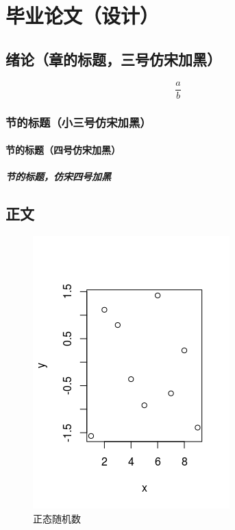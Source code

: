 %
\part{毕业论文（设计）}

\chapter{绪论（章的标题，三号仿宋加黑）}

\begin{equation}
\frac{a}{b}
\end{equation}

\section{节的标题（小三号仿宋加黑）}

\subsection{节的标题（四号仿宋加黑）}

\subsubsection{节的标题，仿宋四号加黑}
\cite{small}
\chapter{正文}

\begin{figure}[H]
    \centering
    \includegraphics{../assets/sample.png}
    \caption{正态随机数}
\end{figure}

